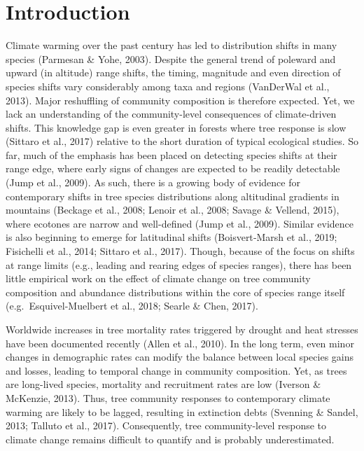 \documentclass[
  a4paperpaper,
]{article}
\begin{document}
\hypertarget{introduction}{%
\section{Introduction}\label{introduction}}

Climate warming over the past century has led to distribution shifts in
many species (Parmesan \& Yohe, 2003). Despite the general trend of
poleward and upward (in altitude) range shifts, the timing, magnitude
and even direction of species shifts vary considerably among taxa and
regions (VanDerWal et al., 2013). Major reshuffling of community
composition is therefore expected. Yet, we lack an understanding of the
community-level consequences of climate-driven shifts. This knowledge
gap is even greater in forests where tree response is slow (Sittaro et
al., 2017) relative to the short duration of typical ecological studies.
So far, much of the emphasis has been placed on detecting species shifts
at their range edge, where early signs of changes are expected to be
readily detectable (Jump et al., 2009). As such, there is a growing body
of evidence for contemporary shifts in tree species distributions along
altitudinal gradients in mountains (Beckage et al., 2008; Lenoir et al.,
2008; Savage \& Vellend, 2015), where ecotones are narrow and
well-defined (Jump et al., 2009). Similar evidence is also beginning to
emerge for latitudinal shifts (Boisvert‐Marsh et al., 2019; Fisichelli
et al., 2014; Sittaro et al., 2017). Though, because of the focus on
shifts at range limits (e.g., leading and rearing edges of species
ranges), there has been little empirical work on the effect of climate
change on tree community composition and abundance distributions within
the core of species range itself (e.g.~Esquivel-Muelbert et al., 2018;
Searle \& Chen, 2017).

Worldwide increases in tree mortality rates triggered by drought and
heat stresses have been documented recently (Allen et al., 2010). In the
long term, even minor changes in demographic rates can modify the
balance between local species gains and losses, leading to temporal
change in community composition. Yet, as trees are long-lived species,
mortality and recruitment rates are low (Iverson \& McKenzie, 2013).
Thus, tree community responses to contemporary climate warming are
likely to be lagged, resulting in extinction debts (Svenning \& Sandel,
2013; Talluto et al., 2017). Consequently, tree community-level response
to climate change remains difficult to quantify and is probably
underestimated.
\end{document}
